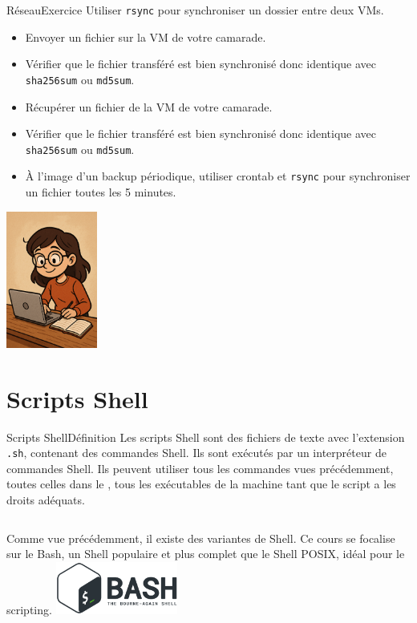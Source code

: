 \documentclass{beamer}
\begin{document}
    \begin{frame}{Réseau}{Exercice \execcounterdispinc}
        Utiliser \lstinline{rsync} pour synchroniser un dossier entre deux VMs.
        \begin{itemize}
            \item Envoyer un fichier sur la VM de votre camarade.
            \item Vérifier que le fichier transféré est bien synchronisé donc identique avec \lstinline{sha256sum} ou \lstinline{md5sum}.
            \item Récupérer un fichier de la VM de votre camarade.
            \item Vérifier que le fichier transféré est bien synchronisé donc identique avec \lstinline{sha256sum} ou \lstinline{md5sum}.
            \item À l'image d'un backup périodique, utiliser crontab et \lstinline{rsync} pour synchroniser un fichier toutes les 5 minutes.
        \end{itemize}
        \begin{center}
            \includegraphics[width=3cm]{image/student-in-front-of-desktop}
        \end{center}
    \end{frame}


    \section{Scripts Shell}\label{sec:scripting-shell}


    \begin{frame}{Scripts Shell}{Définition}
        Les scripts Shell sont des fichiers de texte avec l'extension \lstinline{.sh}, contenant des commandes Shell.
        Ils sont exécutés par un interpréteur de commandes Shell.
        \bigbreak
        Ils peuvent utiliser tous les commandes vues précédemment, toutes celles dans le , tous les exécutables de la machine tant que le script a les droits adéquats.
        \bigbreak
        \begin{columns}
            Comme vue précédemment, il existe des variantes de Shell.
            Ce cours se focalise sur le Bash, un Shell populaire et plus complet que le Shell POSIX, idéal pour le scripting.
            \centering
            \includegraphics[width=4cm]{image/bash-logo}
        \end{columns}
    \end{frame}
\end{document}

